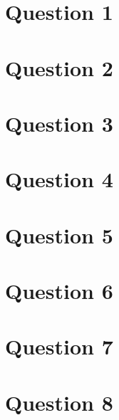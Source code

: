 \documentclass{article}
\begin{document}
\section*{Question 1}

\section*{Question 2}

\section*{Question 3}

\section*{Question 4}

\section*{Question 5}

\section*{Question 6}

\section*{Question 7}

\section*{Question 8}
\end{document}
